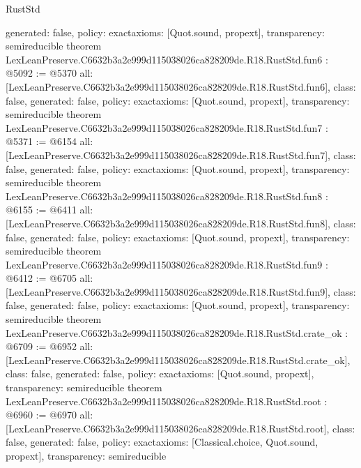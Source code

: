 \begin{lexlean}{RustStd}
\begin{coremodule}
{  generated: false,
  policy: exact{axioms: [Quot.sound, propext]},
  transparency: semireducible
}
theorem LexLeanPreserve.C6632b3a2e999d115038026ca828209de.R18.RustStd.fun6 : @5092 := @5370 {
  all: [LexLeanPreserve.C6632b3a2e999d115038026ca828209de.R18.RustStd.fun6],
  class: false,
  generated: false,
  policy: exact{axioms: [Quot.sound, propext]},
  transparency: semireducible
}
theorem LexLeanPreserve.C6632b3a2e999d115038026ca828209de.R18.RustStd.fun7 : @5371 := @6154 {
  all: [LexLeanPreserve.C6632b3a2e999d115038026ca828209de.R18.RustStd.fun7],
  class: false,
  generated: false,
  policy: exact{axioms: [Quot.sound, propext]},
  transparency: semireducible
}
theorem LexLeanPreserve.C6632b3a2e999d115038026ca828209de.R18.RustStd.fun8 : @6155 := @6411 {
  all: [LexLeanPreserve.C6632b3a2e999d115038026ca828209de.R18.RustStd.fun8],
  class: false,
  generated: false,
  policy: exact{axioms: [Quot.sound, propext]},
  transparency: semireducible
}
theorem LexLeanPreserve.C6632b3a2e999d115038026ca828209de.R18.RustStd.fun9 : @6412 := @6705 {
  all: [LexLeanPreserve.C6632b3a2e999d115038026ca828209de.R18.RustStd.fun9],
  class: false,
  generated: false,
  policy: exact{axioms: [Quot.sound, propext]},
  transparency: semireducible
}
theorem LexLeanPreserve.C6632b3a2e999d115038026ca828209de.R18.RustStd.crate_ok : @6709 := @6952 {
  all: [LexLeanPreserve.C6632b3a2e999d115038026ca828209de.R18.RustStd.crate_ok],
  class: false,
  generated: false,
  policy: exact{axioms: [Quot.sound, propext]},
  transparency: semireducible
}
theorem LexLeanPreserve.C6632b3a2e999d115038026ca828209de.R18.RustStd.root : @6960 := @6970 {
  all: [LexLeanPreserve.C6632b3a2e999d115038026ca828209de.R18.RustStd.root],
  class: false,
  generated: false,
  policy: exact{axioms: [Classical.choice, Quot.sound, propext]},
  transparency: semireducible
}


\end{coremodule}
\end{lexlean}
